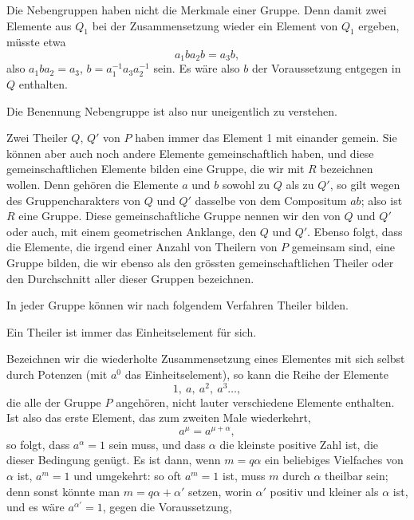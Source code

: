 
Die Nebengruppen haben nicht die Merkmale einer Gruppe. Denn damit zwei
Elemente aus $Q_1$ bei der Zusammensetzung wieder ein Element von $Q_1$
ergeben, müsste etwa
\[
a_1 b a_2 b = a_3 b,
\]
also $a_1 b a_2 = a_3$, $b = a_1^{-1} a_3 a_2^{-1}$ sein. Es wäre also $b$ der
Voraussetzung entgegen in $Q$ enthalten.

Die Benennung Nebengruppe ist also nur uneigentlich zu verstehen.

Zwei Theiler $Q$, $Q'$ von $P$ haben immer das Element 1 mit einander
gemein. Sie können aber auch noch andere Elemente gemeinschaftlich haben,
und diese gemeinschaftlichen Elemente bilden eine Gruppe, die wir mit $R$
bezeichnen wollen. Denn gehören die Elemente $a$ und $b$ sowohl zu $Q$ als
zu $Q'$, so gilt wegen des Gruppencharakters von $Q$ und $Q'$ dasselbe von
dem Compositum $ab$; also ist $R$ eine Gruppe. Diese gemeinschaftliche
Gruppe nennen wir den  von $Q$ und $Q'$
oder auch, mit einem geometrischen Anklange, den  $Q$ und
$Q'$. Ebenso folgt, dass die Elemente, die irgend einer Anzahl von
Theilern von $P$ gemeinsam sind, eine Gruppe bilden, die wir ebenso als
den grössten gemeinschaftlichen Theiler oder den Durchschnitt aller dieser
Gruppen bezeichnen.

In jeder Gruppe können wir nach folgendem Verfahren Theiler bilden.

Ein Theiler ist immer das Einheitselement für sich.

Bezeichnen wir die wiederholte Zusammensetzung eines Elementes mit sich
selbst durch Potenzen (mit $a^0$ das Einheitselement), so kann die Reihe
der Elemente
\[
1,\ a,\ a^2,\ a^3 \ldots,
\]
die alle der Gruppe $P$ angehören, nicht lauter verschiedene Elemente
enthalten. Ist also das erste Element, das zum zweiten Male wiederkehrt,
\[
a^\mu = a^{\mu+\alpha},
\]
so folgt, dass $a^\alpha = 1$ sein muss, und dass $\alpha$ die kleinste
positive Zahl ist, die dieser Bedingung genügt. Es ist dann, wenn
$m = q\alpha$ ein beliebiges Vielfaches von $\alpha$ ist, $a^m = 1$ und
umgekehrt: so oft $a^m = 1$ ist, muss $m$ durch $\alpha$ theilbar sein;
denn sonst könnte man $m = q\alpha + \alpha'$ setzen, worin $\alpha'$
positiv und kleiner als $\alpha$ ist, und es wäre $a^{\alpha'} = 1$, gegen
die Voraussetzung,
